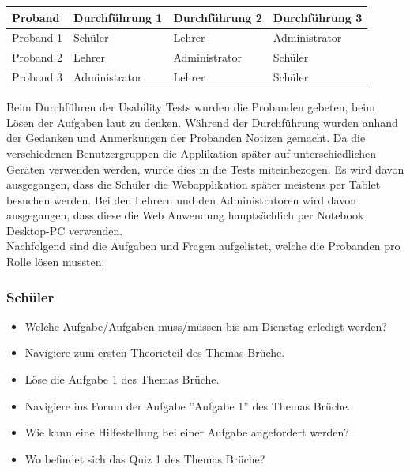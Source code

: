 

\begin{table}[h]
	\centering
	\begin{tabu} to 0.9\textwidth {l X X X}
	\toprule
		Proband & Durchführung 1 & Durchführung 2 & Durchführung 3 \\ 
	\midrule
		Proband 1 & Schüler & Lehrer & Administrator \\
		Proband 2 & Lehrer & Administrator & Schüler \\
		Proband 3 & Administrator & Lehrer & Schüler \\
	\bottomrule
	\end{tabu}
	\label{usability_test_rollen}
\end{table}


Beim Durchführen der Usability Tests wurden die Probanden gebeten, beim Lösen der Aufgaben laut zu denken. Während der Durchführung wurden anhand der Gedanken und Anmerkungen der Probanden Notizen gemacht. Da die verschiedenen Benutzergruppen die Applikation später auf unterschiedlichen Geräten verwenden werden, wurde dies in die Tests miteinbezogen. Es wird davon ausgegangen, dass die Schüler die Webapplikation später meistens per Tablet besuchen werden. Bei den Lehrern und den Administratoren wird davon ausgegangen, dass diese die Web Anwendung hauptsächlich per Notebook Desktop-PC verwenden. \\

Nachfolgend sind die Aufgaben und Fragen aufgelistet, welche die Probanden pro Rolle lösen mussten:

\subsubsection*{Schüler}
\begin{itemize}
	\item Welche Aufgabe/Aufgaben muss/müssen bis am Dienstag erledigt werden?
	\item Navigiere zum ersten Theorieteil des Themas Brüche.
	\item Löse die Aufgabe 1 des Themas Brüche.
	\item Navigiere ins Forum der Aufgabe ''Aufgabe 1'' des Themas Brüche.
	\item Wie kann eine Hilfestellung bei einer Aufgabe angefordert werden?
	\item Wo befindet sich das Quiz 1 des Themas Brüche?
\end{itemize}


